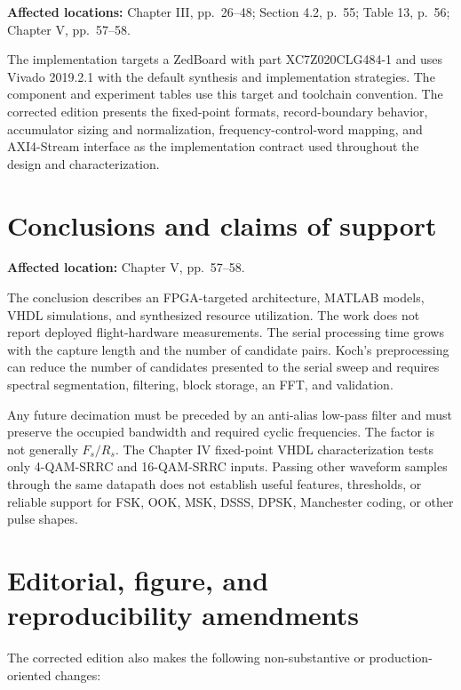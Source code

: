 \documentclass[12pt]{article}
\begin{document}
\noindent\textbf{Affected locations:} Chapter III, pp.~26--48; Section 4.2, p.~55; Table 13, p.~56; Chapter V, pp.~57--58.

The implementation targets a ZedBoard with part XC7Z020CLG484-1 and uses Vivado 2019.2.1 with the default synthesis and implementation strategies. The component and experiment tables use this target and toolchain convention. The corrected edition presents the fixed-point formats, record-boundary behavior, accumulator sizing and normalization, frequency-control-word mapping, and AXI4-Stream interface as the implementation contract used throughout the design and characterization.

\section{Conclusions and claims of support}

\noindent\textbf{Affected location:} Chapter V, pp.~57--58.

The conclusion describes an FPGA-targeted architecture, MATLAB models, VHDL simulations, and synthesized resource utilization. The work does not report deployed flight-hardware measurements. The serial processing time grows with the capture length and the number of candidate pairs. Koch's preprocessing can reduce the number of candidates presented to the serial sweep and requires spectral segmentation, filtering, block storage, an FFT, and validation.

Any future decimation must be preceded by an anti-alias low-pass filter and must preserve the occupied bandwidth and required cyclic frequencies. The factor is not generally $F_s/R_s$. The Chapter IV fixed-point VHDL characterization tests only 4-QAM-SRRC and 16-QAM-SRRC inputs. Passing other waveform samples through the same datapath does not establish useful features, thresholds, or reliable support for FSK, OOK, MSK, DSSS, DPSK, Manchester coding, or other pulse shapes.

\section{Editorial, figure, and reproducibility amendments}

The corrected edition also makes the following non-substantive or production-oriented changes:
\end{document}
